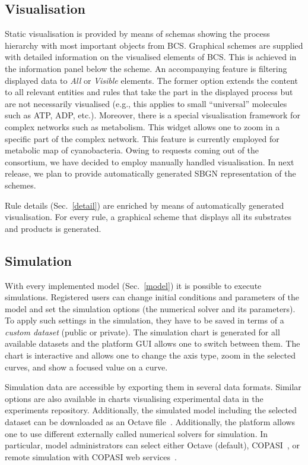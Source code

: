 \documentclass[runningheads]{llncs}
\begin{document}
\subsection{Visualisation}
\label{visual}
Static visualisation is provided by means of schemas showing the process hierarchy with most important objects from BCS.
Graphical schemes are supplied with detailed information on the visualised elements of BCS. This is achieved in the information panel below the scheme. An accompanying feature is filtering displayed data to \textit{All} or \emph{Visible} elements. The former option extends the content to all relevant entities and rules that take the part in the displayed process but are not necessarily visualised (e.g., this applies to small ``universal'' molecules such as ATP, ADP, etc.). 
Moreover, there is a special visualisation framework for complex networks such as metabolism. This widget allows one to zoom in a specific part of the complex network. This feature is currently employed for metabolic map of cyanobacteria.  Owing to requests coming out of the consortium, we have decided to employ manually handled visualisation. In next release, we plan to provide automatically generated SBGN representation of the schemes.

Rule details (Sec.~\ref{detail}) are enriched by means of automatically generated visualisation. For every rule, a graphical scheme that displays all its substrates and products is generated. 

\subsection{Simulation}
\label{simul}
With every implemented model (Sec.~\ref{model}) it is possible to execute simulations. Registered users can change initial conditions and parameters of the model and set the simulation options (the numerical solver and its parameters). To apply such settings in the simulation, they have to be saved in terms of a \emph{custom dataset} (public or private). The simulation chart is generated for all available datasets and the platform GUI allows one to switch between them. The chart is interactive and allows one to change the axis type, zoom in the selected curves, and show a focused value on a curve. 

Simulation data are accessible by exporting them in several data formats. Similar options are also available in charts visualising experimental data in the experiments repository. Additionally, the simulated model including the selected dataset can be downloaded as an Octave file~\cite{octave}. Additionally, the platform allows one to use different externally called numerical solvers for simulation. In particular, model administrators can select either Octave (default), COPASI~\cite{copasi}, or remote simulation with COPASI web services~\cite{copasiWS}.
\end{document}
